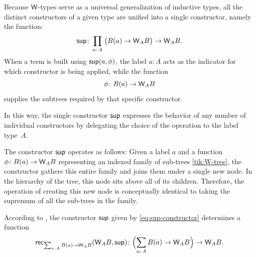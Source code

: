 Because $\mathsf{W}$-types serve as a universal generalization of inductive types, all the distinct constructors of a given type are unified into a single constructor, namely the function:
\begin{equation}\label{eq:sup-constructor}
    \fun{sup}\colon
        \prod_{a\colon A}\;
        \bigl(
            B(a)\to\fun W_AB
        \bigr)
            \to\fun W_AB.
\end{equation}
When a term is built using $\mathsf{sup}(a,\phi)$, the label $a\colon A$ acts as the indicator for which constructor is being applied, while the function
\[
    \phi\colon B(a)\to\fun W_AB
\]
supplies the subtrees required by that specific constructor.

In this way, the single constructor $\mathsf{sup}$ expresses the behavior of any number of individual constructors by delegating the choice of the operation to the label type~$A$.

\begin{rem}
    The constructor $\mathsf{sup}$ operates as follows: Given a label $a$ and a function $\phi\colon B(a)\to\fun W_AB$ representing an indexed family of sub-trees \eqref{tik:W-tree}, the constructor gathers this entire family and joins them under a single new node. In the hierarchy of the tree, this node sits above all of its children. Therefore, the operation of creating this new node is conceptually identical to taking the supremum of all the sub-trees in the family.
\end{rem}

\begin{rem}\label{rem:rec(sup)-is-P(W)->W}
    According to , the constructor $\mathsf{sup}$ given by \eqref{eq:sup-constructor} determines a function
    \begin{equation}\label{eq:P(W)->W}
        \fun{rec}_{\sum_{a\colon A}B(a)\to\fun W_AB}
            (
                \fun W_AB,
                \fun{sup}
            )
            \colon
            \Bigl(
                \sum_{a\colon A}B(a)\to\fun W_AB
            \Bigr)
            \to\fun W_AB.
    \end{equation}
\end{rem}

